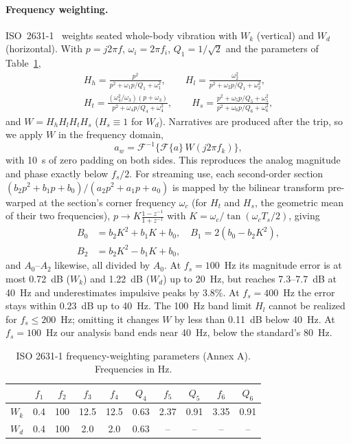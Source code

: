 \paragraph{Frequency weighting.}
ISO~2631-1~\cite{iso2631} weights seated whole-body vibration with $W_k$ (vertical) and $W_d$ (horizontal).
With $p=j2\pi f$, $\omega_i=2\pi f_i$, $Q_1=1/\sqrt2$ and the parameters of Table~\ref{tab:iso},
\begin{gather}
H_h=\frac{p^2}{p^2+\omega_1p/Q_1+\omega_1^2},\qquad
H_l=\frac{\omega_2^2}{p^2+\omega_2p/Q_1+\omega_2^2},\\
H_t=\frac{(\omega_4^2/\omega_3)(p+\omega_3)}{p^2+\omega_4p/Q_4+\omega_4^2},\qquad
H_s=\frac{p^2+\omega_5p/Q_5+\omega_5^2}{p^2+\omega_6p/Q_6+\omega_6^2},
\end{gather}
and $W=H_hH_lH_tH_s$ ($H_s\equiv1$ for $W_d$).
Narratives are produced after the trip, so we apply $W$ in the frequency domain,
\begin{equation}
a_w=\mathcal F^{-1}\{\mathcal F\{a\}\,W(j2\pi f_k)\},
\end{equation}
with 10~s of zero padding on both sides.
This reproduces the analog magnitude and phase exactly below $f_s/2$.
For streaming use, each second-order section $(b_2p^2+b_1p+b_0)/(a_2p^2+a_1p+a_0)$ is mapped by the bilinear transform pre-warped at the section's corner frequency $\omega_c$ (for $H_t$ and $H_s$, the geometric mean of their two frequencies), $p\rightarrow K\frac{1-z^{-1}}{1+z^{-1}}$ with $K=\omega_c/\tan(\omega_cT_s/2)$, giving
\begin{equation}
\begin{aligned}
B_0&=b_2K^2+b_1K+b_0, \quad B_1=2(b_0-b_2K^2),\\
B_2&=b_2K^2-b_1K+b_0 ,
\end{aligned}
\end{equation}
and $A_0$--$A_2$ likewise, all divided by $A_0$.
At $f_s=100$~Hz its magnitude error is at most 0.72~dB ($W_k$) and 1.22~dB ($W_d$) up to 20~Hz, but reaches 7.3--7.7~dB at 40~Hz and underestimates impulsive peaks by 3.8\%.
At $f_s=400$~Hz the error stays within 0.23~dB up to 40~Hz.
The 100~Hz band limit $H_l$ cannot be realized for $f_s\le200$~Hz; omitting it changes $W$ by less than 0.11~dB below 40~Hz.
At $f_s=100$~Hz our analysis band ends near 40~Hz, below the standard's 80~Hz.

\begin{table}[t]
\caption{ISO 2631-1 frequency-weighting parameters (Annex A). Frequencies in Hz.}
\label{tab:iso}
\small
\setlength{\tabcolsep}{3.5pt}
\begin{tabular}{lccccccccc}
\toprule
 & $f_1$ & $f_2$ & $f_3$ & $f_4$ & $Q_4$ & $f_5$ & $Q_5$ & $f_6$ & $Q_6$\\
\midrule
$W_k$ & 0.4 & 100 & 12.5 & 12.5 & 0.63 & 2.37 & 0.91 & 3.35 & 0.91\\
$W_d$ & 0.4 & 100 & 2.0 & 2.0 & 0.63 & -- & -- & -- & --\\
\bottomrule
\end{tabular}
\end{table}

